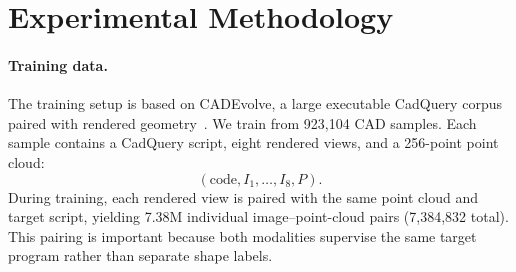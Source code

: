 \documentclass{article}
\begin{document}
\section{Experimental Methodology}

\paragraph{Training data.}
The training setup is based on CADEvolve, a large executable CadQuery corpus paired with rendered geometry~\cite{elistratov2026cadevolve}. We train from 923{,}104 CAD samples. Each sample contains a CadQuery script, eight rendered views, and a 256-point point cloud:
\[
(\mathrm{code}, I_1,\dots,I_8, P).
\]
During training, each rendered view is paired with the same point cloud and target script, yielding 7.38M individual image--point-cloud pairs (7{,}384{,}832 total). This pairing is important because both modalities supervise the same target program rather than separate shape labels.
\end{document}
